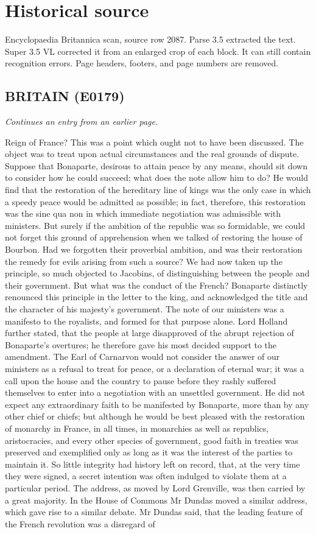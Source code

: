 \documentclass{article}
\begin{document}
\section*{Historical source}
Encyclopaedia Britannica scan, source row 2087. Parse 3.5 extracted the text. Super 3.5 VL corrected it from an enlarged crop of each block. It can still contain recognition errors.
Page headers, footers, and page numbers are removed.

\subsection*{BRITAIN (E0179)}
\textit{Continues an entry from an earlier page.}

Reign of France? This was a point which ought not to have been discussed. The object was to treat upon actual circumstances and the real grounds of dispute. Suppose that Bonaparte, desirous to attain peace by any means, should sit down to consider how he could succeed; what does the note allow him to do? He would find that the restoration of the hereditary line of kings was the only case in which a speedy peace would be admitted as possible; in fact, therefore, this restoration was the sine qua non in which immediate negotiation was admissible with ministers. But surely if the ambition of the republic was so formidable, we could not forget this ground of apprehension when we talked of restoring the house of Bourbon. Had we forgotten their proverbial ambition, and was their restoration the remedy for evils arising from such a source? We had now taken up the principle, so much objected to Jacobins, of distinguishing between the people and their government. But what was the conduct of the French? Bonaparte distinctly renounced this principle in the letter to the king, and acknowledged the title and the character of his majesty's government. The note of our ministers was a manifesto to the royalists, and formed for that purpose alone. Lord Holland further stated, that the people at large disapproved of the abrupt rejection of Bonaparte's overtures; he therefore gave his most decided support to the amendment. The Earl of Carnarvon would not consider the answer of our ministers as a refusal to treat for peace, or a declaration of eternal war; it was a call upon the house and the country to pause before they rashly suffered themselves to enter into a negotiation with an unsettled government. He did not expect any extraordinary faith to be manifested by Bonaparte, more than by any other chief or chiefs; but although he would be best pleased with the restoration of monarchy in France, in all times, in monarchies as well as republics, aristocracies, and every other species of government, good faith in treaties was preserved and exemplified only as long as it was the interest of the parties to maintain it. So little integrity had history left on record, that, at the very time they were signed, a secret intention was often indulged to violate them at a particular period. The address, as moved by Lord Grenville, was then carried by a great majority. In the House of Commons Mr Dundas moved a similar address, which gave rise to a similar debate. Mr Dundas said, that the leading feature of the French revolution was a disregard of 
\end{document}

